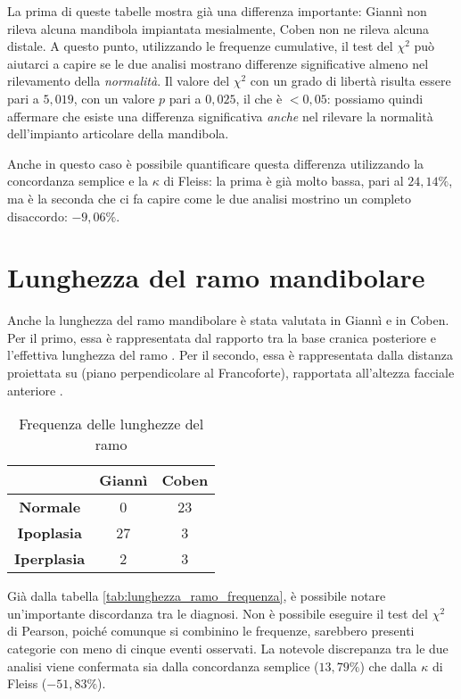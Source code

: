 La prima di queste tabelle mostra già una differenza importante: Giannì non rileva alcuna mandibola impiantata mesialmente, Coben non ne rileva alcuna distale. A questo punto, utilizzando le frequenze cumulative, il test del $\chi^2$ può aiutarci a capire se le due analisi mostrano differenze significative almeno nel rilevamento della \emph{normalità}. Il valore del $\chi^2$ con un grado di libertà risulta essere pari a $5,019$, con un valore $p$ pari a $0,025$, il che è $< 0,05$: possiamo quindi affermare che esiste una differenza significativa \emph{anche} nel rilevare la normalità dell'impianto articolare della mandibola.

Anche in questo caso è possibile quantificare questa differenza utilizzando la concordanza semplice e la $\kappa$ di Fleiss: la prima è già molto bassa, pari al $24,14\%$, ma è la seconda che ci fa capire come le due analisi mostrino un completo disaccordo: $-9,06\%$.

\section{Lunghezza del ramo mandibolare}
Anche la lunghezza del ramo mandibolare è stata valutata in Giannì e in Coben. Per il primo, essa è rappresentata dal rapporto tra la base cranica posteriore  e l'effettiva lunghezza del ramo . Per il secondo, essa è rappresentata dalla distanza  proiettata su  (piano perpendicolare al Francoforte), rapportata all'altezza facciale anteriore .

\begin{table}[bh]
\centering
\caption{Frequenza delle lunghezze del ramo}
\label{tab:lunghezza_ramo_frequenza}
\begin{tabular}{>{\bfseries}ccc}
\toprule
 & \textbf{Giannì} & \textbf{Coben} \\
\midrule
Normale & 0 & 23 \\
Ipoplasia & 27 & 3 \\
Iperplasia & 2 & 3 \\
\bottomrule
\end{tabular}
\end{table}

Già dalla tabella \vref{tab:lunghezza_ramo_frequenza}, è possibile notare un'importante discordanza tra le diagnosi. Non è possibile eseguire il test del $\chi^2$ di Pearson, poiché comunque si combinino le frequenze, sarebbero presenti categorie con meno di cinque eventi osservati. La notevole discrepanza tra le due analisi viene confermata sia dalla concordanza semplice ($13,79\%$) che dalla $\kappa$ di Fleiss ($-51,83\%$).
